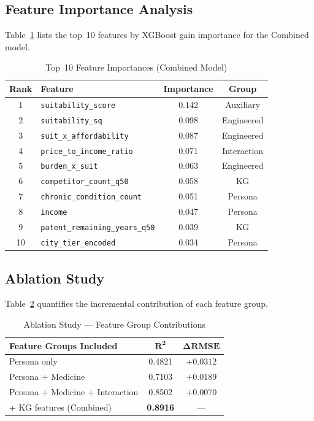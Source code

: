 \documentclass[10pt,journal,compsoc]{IEEEtran}
\begin{document}
\subsection{Feature Importance Analysis}

Table~\ref{tab:feat_imp} lists the top~10 features by XGBoost gain importance for the
Combined model.

\begin{table}[!t]
\caption{Top~10 Feature Importances (Combined Model)}
\label{tab:feat_imp}
\centering
\begin{tabular}{clcc}
\toprule
\textbf{Rank} & \textbf{Feature} & \textbf{Importance} & \textbf{Group} \\
\midrule
1  & \texttt{suitability\_score}          & 0.142 & Auxiliary   \\
2  & \texttt{suitability\_sq}             & 0.098 & Engineered  \\
3  & \texttt{suit\_x\_affordability}      & 0.087 & Engineered  \\
4  & \texttt{price\_to\_income\_ratio}    & 0.071 & Interaction \\
5  & \texttt{burden\_x\_suit}             & 0.063 & Engineered  \\
6  & \texttt{competitor\_count\_q50}      & 0.058 & KG          \\
7  & \texttt{chronic\_condition\_count}   & 0.051 & Persona     \\
8  & \texttt{income}                      & 0.047 & Persona     \\
9  & \texttt{patent\_remaining\_years\_q50} & 0.039 & KG        \\
10 & \texttt{city\_tier\_encoded}         & 0.034 & Persona     \\
\bottomrule
\end{tabular}
\end{table}

\subsection{Ablation Study}

Table~\ref{tab:ablation} quantifies the incremental contribution of each feature group.

\begin{table}[!t]
\caption{Ablation Study --- Feature Group Contributions}
\label{tab:ablation}
\centering
\begin{tabular}{lcc}
\toprule
\textbf{Feature Groups Included} & $\boldsymbol{R^2}$ & $\boldsymbol{\Delta\text{RMSE}}$ \\
\midrule
Persona only                      & 0.4821 & $+0.0312$ \\
Persona + Medicine                & 0.7103 & $+0.0189$ \\
Persona + Medicine + Interaction  & 0.8502 & $+0.0070$ \\
+ KG features (Combined)          & \textbf{0.8916} & --- \\
\bottomrule
\end{tabular}
\end{table}
\end{document}
